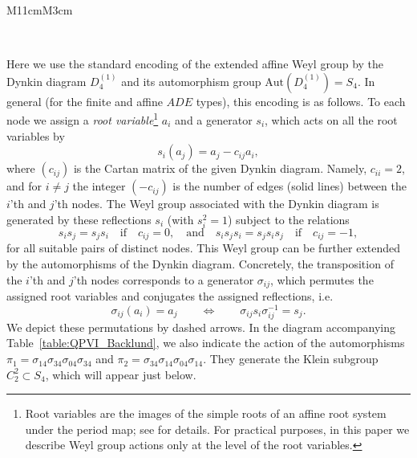 \documentclass[12pt,a4paper]{article}
\numberwithin{equation}{section}
\begin{document}
\begin{table}[H]
\begin{tabular}{M{11cm}M{3cm}}
			\\
\end{tabular}
\caption{Action of the QPVI symmetry group $S_4 \ltimes W\left(D_4^{(1)}\right)$.}
\label{table:QPVI_Backlund}
\end{table}
Here we use the standard encoding of the extended affine Weyl group by the Dynkin diagram $D_4^{(1)}$ and its automorphism group $\mathrm{Aut}\left(D_4^{(1)}\right)=S_4$. In general (for the finite and affine $ADE$ types), this encoding is as follows. To each node we assign a \textit{root variable}\footnote{Root variables are the images of the simple roots of an affine root system under the period map; see \cite[Sec.5]{S01} for details. For practical purposes, in this paper we describe Weyl group actions only at the level of the root variables.} $a_i$ and a generator $s_i$, which acts on all the root variables by
\begin{equation}\label{refl_act}
s_i(a_j) = a_j - c_{ij}a_i, 
\end{equation}
where $(c_{ij})$ is the Cartan matrix of the given Dynkin diagram. Namely, $c_{ii}=2$, and for $i\neq j$ the integer $(-c_{ij})$ is the number of edges (solid lines) between the $i$'th and $j$'th nodes.
The Weyl group associated with the Dynkin diagram is generated by these reflections $s_i$ (with $s_i^2=1$) subject to the relations
\begin{equation}
s_is_j=s_js_i \quad \textrm{if} \quad c_{ij}=0, \quad \textrm{and} \quad s_is_js_i=s_js_is_j  \quad \textrm{if} \quad c_{ij}=-1,   
\end{equation}
for all suitable pairs of distinct nodes.
This Weyl group can be further extended by the automorphisms of the Dynkin diagram. Concretely, the transposition of the $i$'th and $j$'th nodes corresponds to a generator $\sigma_{ij}$, which permutes the assigned root variables and conjugates the assigned reflections, i.e.
\begin{equation}
\sigma_{ij}(a_i) = a_j \qquad \Leftrightarrow \qquad \sigma_{ij} s_i \sigma_{ij}^{-1} = s_j. 
\end{equation}  
We depict these permutations by dashed arrows. In the diagram accompanying Table~\ref{table:QPVI_Backlund}, we also indicate the action of the automorphisms $\pi_1=\sigma_{14}\sigma_{34}\sigma_{04}\sigma_{34}$ and $\pi_2=\sigma_{34}\sigma_{14}\sigma_{04}\sigma_{14}$. They generate the Klein subgroup $C_2^2\subset S_4$, which will appear just below. 
\end{document}
